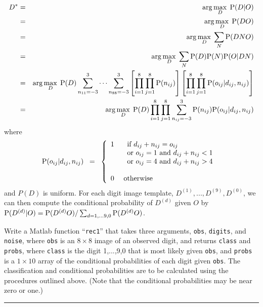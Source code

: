 \documentclass[12pt]{article}
\begin{document}
\begin{eqnarray*}
D^* & = & \arg\max_D \; {\rm P}(D|O)
\\
& = & \arg\max_D \; {\rm P}(DO)
\\
& = & \arg\max_D \; \sum_N {\rm P}(DNO)
\\
& = & \arg\max_D \; \sum_N {\rm P}(D) {\rm P}(N) {\rm P}(O|DN)
\\
& = & \arg\max_D \; {\rm P}(D) \sum_{n_{11}=-3}^3\cdots\sum_{n_{88}=-3}^3 \left[\prod_{i=1}^8\prod_{j=1}^8{\rm P}(n_{ij})\right]\left[\prod_{i=1}^8\prod_{j=1}^8{\rm P}(o_{ij}|d_{ij},n_{ij})\right]
\\
& = & \arg\max_D \; {\rm P}(D) \prod_{i=1}^8\prod_{j=1}^8 \sum_{n_{ij}=-3}^3 {\rm P}(n_{ij}){\rm P}(o_{ij}|d_{ij},n_{ij})
\end{eqnarray*}
where
\[
\PP(o_{ij}|d_{ij},n_{ij}) \;\;=\;\;\left\{
\begin{array}{ll}
1 & \begin{array}[t]{l}\mbox{ if } d_{ij}+n_{ij}=o_{ij}\\
                    \mbox{ or } o_{ij} = 1 \mbox{ and } d_{ij}+n_{ij}<1\\
                    \mbox{ or } o_{ij} = 4 \mbox{ and } d_{ij}+n_{ij}>4\\
\rule{0em}{1ex}
    \end{array}
\\
0 & \mbox{ otherwise }
\end{array}
\right.
\]
and $P(D)$ is uniform.
For each digit image template, $D^{(1)},...,D^{(9)},D^{(0)}$,
we can then compute the conditional probability of $D^{(d)}$ given
$O$ by ${\rm P}(D^{(d)}|O)={\rm P}(D^{(d)}O)/\sum_{d=1,...9,0}{\rm P}(D^{(d)}O)$.

\bigskip

Write a Matlab function ``{\tt rec1}'' that takes three arguments,
{\tt obs}, {\tt digits}, and {\tt noise}, where {\tt obs} is
an $8\times8$ image of an observed digit,
and returns {\tt class} and {\tt probs},
where {\tt class} is the digit 1,...,9,0 that is most likely given
{\tt obs}, and {\tt probs} is a $1\times10$ array of the conditional
probabilities of each digit given {\tt obs}.
The classification and conditional probabilities are to be calculated
using the procedures outlined above.
(Note that the conditional probabilities may be near zero or one.)


\vspace*{1\baselineskip}

\hrule
\end{document}
